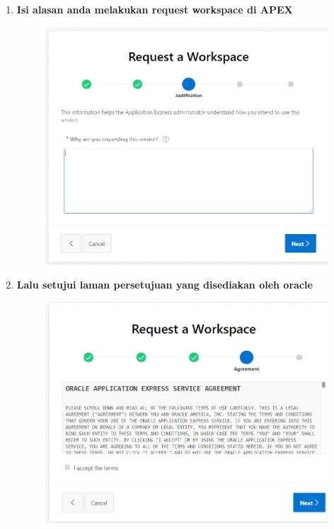 \begin{enumerate}
\item \textbf{Isi alasan anda melakukan request workspace di APEX}
\begin{figure}[H]
    \centering
    \includegraphics[scale=0.3]{figures/5.png}
    \label{5}
\end{figure}


\item \textbf{Lalu setujui laman persetujuan yang disediakan oleh oracle}
\begin{figure}[H]
    \centering
    \includegraphics[scale=0.3]{figures/6.png}
    \label{6}
\end{figure}



\end{enumerate}
